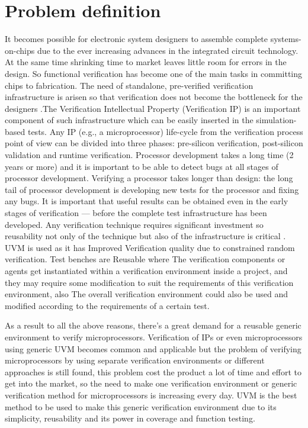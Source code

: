 \documentclass[conference,10 pt,twoside]{IEEEtran}
\begin{document}
     
\section{Problem definition}
 
It  becomes possible for electronic system designers to assemble complete systems-on-chips due to the ever increasing advances in the integrated circuit technology. At the same time shrinking time to market leaves little room for errors in the design. So functional verification has become one of the main tasks in committing chips to fabrication. The need of standalone, pre-verified verification infrastructure is arisen so that verification does not become the bottleneck for the designers .The Verification Intellectual Property (Verification IP) is an important component of such infrastructure which can be easily inserted in the simulation-based tests.
Any IP (e.g., a microprocessor) life-cycle from the verification process point of view can be divided into three phases: pre-silicon verification, post-silicon validation and runtime verification. Processor development takes a long time (2 years or more) and it is important to be able to detect bugs at all stages of processor development. Verifying a processor takes longer than design: the long tail of processor development is developing new tests for the processor and fixing any bugs. It is important that useful results can be obtained even in the early stages of verification — before the complete test infrastructure has been developed. Any verification technique requires significant investment so reusability not only of the technique but also of the infrastructure is critical \cite{b4}.
UVM is used as it has Improved Verification quality due to constrained random verification. Test benches are  Reusable where The verification components or agents get instantiated within a verification environment inside a project, and they may require some modification to suit the requirements of this verification environment, also The overall verification environment could also be used and modified according to the requirements of a certain test.
\par
As a result to all the above reasons, there's a great demand for a reusable generic environment to verify microprocessors. Verification of IPs or even microprocessors using generic UVM becomes common and applicable but  the problem of verifying  microprocessors  by using separate verification environments or different approaches is still found, this problem cost the product a lot of time and effort to get into the market, so the need to make one verification environment or generic verification method for microprocessors is increasing every day. UVM is the best method to be used to make this generic verification environment due to its simplicity, reusability and its power in coverage and function testing.
\end{document}
